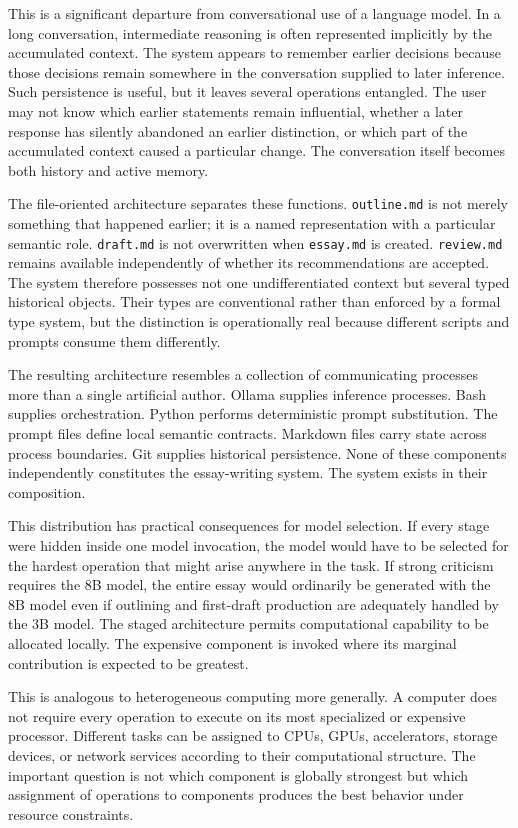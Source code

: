 \documentclass[11pt]{article}
\begin{document}
This is a significant departure from conversational use of a language model. In a long conversation, intermediate reasoning is often represented implicitly by the accumulated context. The system appears to remember earlier decisions because those decisions remain somewhere in the conversation supplied to later inference. Such persistence is useful, but it leaves several operations entangled. The user may not know which earlier statements remain influential, whether a later response has silently abandoned an earlier distinction, or which part of the accumulated context caused a particular change. The conversation itself becomes both history and active memory.

The file-oriented architecture separates these functions. \texttt{outline.md} is not merely something that happened earlier; it is a named representation with a particular semantic role. \texttt{draft.md} is not overwritten when \texttt{essay.md} is created. \texttt{review.md} remains available independently of whether its recommendations are accepted. The system therefore possesses not one undifferentiated context but several typed historical objects. Their types are conventional rather than enforced by a formal type system, but the distinction is operationally real because different scripts and prompts consume them differently.

The resulting architecture resembles a collection of communicating processes more than a single artificial author. Ollama supplies inference processes. Bash supplies orchestration. Python performs deterministic prompt substitution. The prompt files define local semantic contracts. Markdown files carry state across process boundaries. Git supplies historical persistence. None of these components independently constitutes the essay-writing system. The system exists in their composition.

This distribution has practical consequences for model selection. If every stage were hidden inside one model invocation, the model would have to be selected for the hardest operation that might arise anywhere in the task. If strong criticism requires the 8B model, the entire essay would ordinarily be generated with the 8B model even if outlining and first-draft production are adequately handled by the 3B model. The staged architecture permits computational capability to be allocated locally. The expensive component is invoked where its marginal contribution is expected to be greatest.

This is analogous to heterogeneous computing more generally. A computer does not require every operation to execute on its most specialized or expensive processor. Different tasks can be assigned to CPUs, GPUs, accelerators, storage devices, or network services according to their computational structure. The important question is not which component is globally strongest but which assignment of operations to components produces the best behavior under resource constraints.
\end{document}
